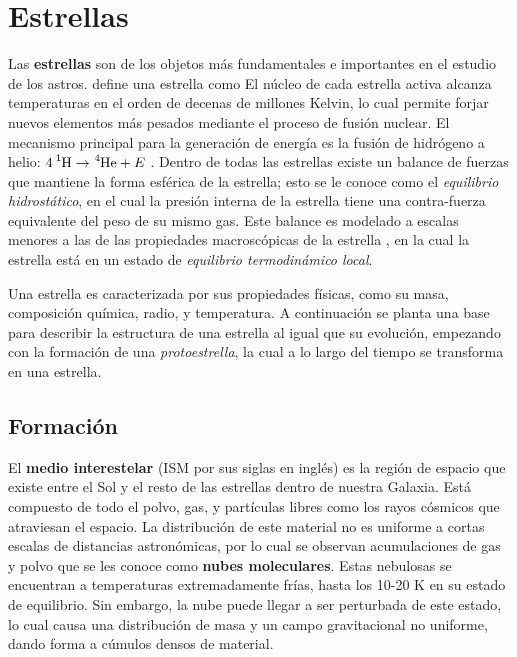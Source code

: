 \chapter{Estrellas}

Las \textbf{estrellas} son de los objetos más fundamentales e importantes en el
estudio de los astros.  define una
estrella como 
El núcleo de cada estrella activa alcanza temperaturas en el orden de decenas de
millones Kelvin, lo cual permite forjar nuevos elementos más pesados mediante el
proceso de fusión nuclear. El mecanismo principal para la generación de energía
es la fusión de hidrógeno a helio: $\ce{4 ^1H} \rightarrow \ce{^4He} + E$ .
Dentro de todas las estrellas existe un balance de fuerzas que mantiene la forma
esférica de la estrella; esto se le conoce como el \textit{equilibrio
hidrostático}, en el cual la presión interna de la estrella tiene una
contra-fuerza equivalente del peso de su mismo gas. Este balance es modelado a
escalas menores a las de las propiedades macroscópicas de la estrella
, en la cual la
estrella está en un estado de \textit{equilibrio termodinámico local}. 

Una estrella es caracterizada por sus propiedades físicas, como su masa,
composición química, radio, y temperatura. A continuación se planta una base
para describir la estructura de una estrella al igual que su evolución,
empezando con la formación de una \textit{protoestrella}, la cual a lo largo del
tiempo se transforma en una estrella.

\section{Formación}


El \textbf{medio interestelar} (ISM por sus siglas en inglés) es la región de
espacio que existe entre el Sol y el resto de las estrellas dentro de nuestra
Galaxia. Está compuesto de todo el polvo, gas, y partículas libres como los
rayos cósmicos que atraviesan el espacio. La distribución de este material no es
uniforme a cortas escalas de distancias astronómicas, por lo cual se observan
acumulaciones de gas y polvo que se les conoce como \textbf{nubes moleculares}.
Estas nebulosas se encuentran a temperaturas extremadamente frías, hasta los
10-20 K en su estado de equilibrio. Sin embargo, la nube puede llegar a ser
perturbada de este estado, lo cual causa una distribución de masa y un campo
gravitacional no uniforme, dando forma a cúmulos densos de material.

